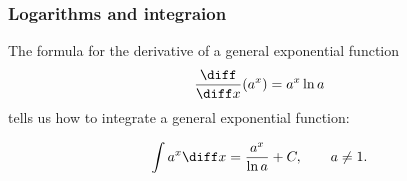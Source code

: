 \begin{frame}
\frametitle{Logarithms and integraion}
The formula for the derivative of a general exponential function
\[
\frac{\diff}{\diff x} (a^x) = a^x\ln a
\]
tells us how to integrate a general exponential function:
\begin{theorem}
\[
\int a^x \diff x = \frac{a^x}{\ln a} + C, \qquad a\neq 1.
\]
\end{theorem}
\end{frame}
